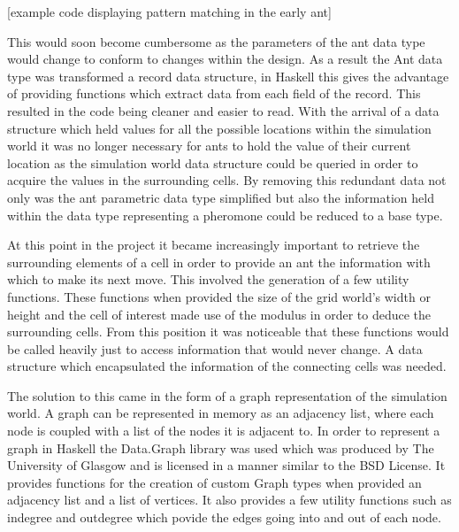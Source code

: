 \documentclass[main.tex]{subfiles}
\begin{document}
[example code displaying pattern matching in the early ant]

This would soon become cumbersome as the parameters of the ant data type would change to conform to changes within the design. As a result the Ant data type was transformed a record data structure, in Haskell this gives the advantage of providing functions which extract data from each field of the record. This resulted in the code being cleaner and easier to read. With the arrival of a data structure which held values for all the possible locations within the simulation world it was no longer necessary for ants to hold the value of their current location as the simulation world data structure could be queried in order to acquire the values in the surrounding cells. By removing this redundant data not only was the ant parametric data type simplified but also the information held within the data type representing a pheromone could be reduced to a base type.

At this point in the project it became increasingly important to retrieve the surrounding elements of a cell in order to provide an ant the information with which to make its next move. This involved the generation of a few utility functions. These functions when provided the size of the grid world's width or height and the cell of interest made use of the modulus in order to deduce the surrounding cells. From this position it was noticeable that these functions would be called heavily just to access information that would never change. A data structure which encapsulated the information of the connecting cells was needed.

The solution to this came in the form of  a graph representation of the simulation world. A graph can be represented in memory as an adjacency list, where each node is coupled with a list of the nodes it is adjacent to. In order to represent a graph in Haskell the Data.Graph library was used which was produced  by The University of Glasgow and is licensed in a manner similar to the BSD License. It provides functions for the creation of custom Graph types when provided an adjacency list and a list of vertices. It also provides a few utility functions such as indegree and outdegree  which povide the edges going into and out of each node.
\end{document}
